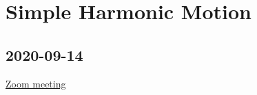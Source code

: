 \chapter{Simple Harmonic Motion}

\section{2020-09-14}

\href{https://calpoly.zoom.us/j/680327688}{Zoom meeting}